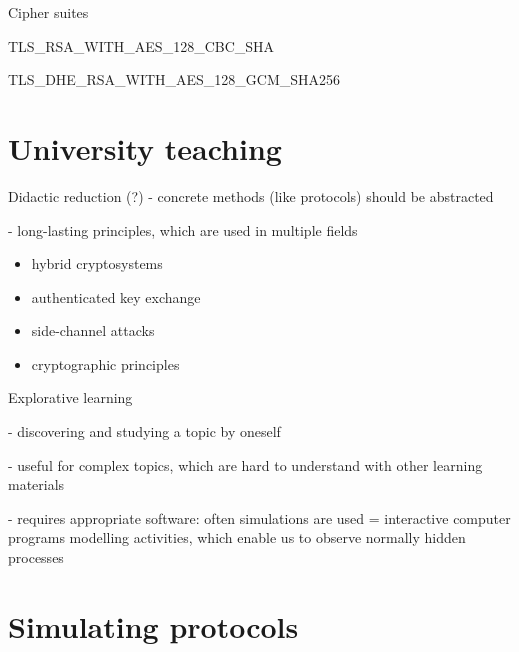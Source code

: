 \begin{frame}[c]{Cipher suites}

\begin{center}

TLS\_{\color{svshellblau2}RSA}\_WITH\_{\color{svsrot}AES\_128\_CBC}\_{\color{svsgrau2}SHA}

\vspace{1cm}

TLS\_{\color{svshellblau2}DHE\_RSA}\_WITH\_{\color{svsrot}AES\_128\_GCM}\_{\color{svsgrau2}SHA256}

\end{center}

\end{frame}

\section{University teaching}
%

\begin{frame}{Didactic reduction (?)}
- concrete methods (like protocols) should be abstracted

- long-lasting principles, which are used in multiple fields

\begin{itemize}
	\item hybrid cryptosystems 
	\item authenticated key exchange
	\item side-channel attacks
	\item cryptographic principles
\end{itemize}

\end{frame}

\begin{frame}{Explorative learning}

- discovering and studying a topic by oneself

- useful for complex topics, which are hard to understand with other learning materials

- requires appropriate software: often simulations are used = interactive computer programs modelling activities, which enable us to observe normally hidden processes
 
\end{frame}

\section{Simulating protocols}

